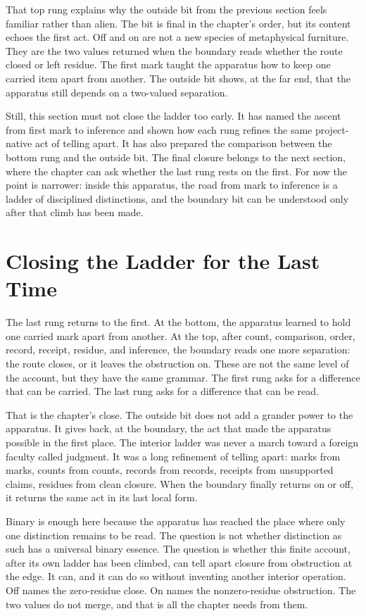 That top rung explains why the outside bit from the previous section feels
familiar rather than alien. The bit is final in the chapter's order, but its
content echoes the first act. Off and on are not a new species of metaphysical
furniture. They are the two values returned when the boundary reads whether the
route closed or left residue. The first mark taught the apparatus how to keep
one carried item apart from another. The outside bit shows, at the far end,
that the apparatus still depends on a two-valued separation.

Still, this section must not close the ladder too early. It has named the
ascent from first mark to inference and shown how each rung refines the same
project-native act of telling apart. It has also prepared the comparison
between the bottom rung and the outside bit. The final closure belongs to the
next section, where the chapter can ask whether the last rung rests on the
first. For now the point is narrower: inside this apparatus, the road from mark
to inference is a ladder of disciplined distinctions, and the boundary bit can
be understood only after that climb has been made.

\section{Closing the Ladder for the Last Time}

The last rung returns to the first. At the bottom, the apparatus learned to
hold one carried mark apart from another. At the top, after count,
comparison, order, record, receipt, residue, and inference, the boundary reads
one more separation: the route closes, or it leaves the obstruction on. These
are not the same level of the account, but they have the same grammar. The
first rung asks for a difference that can be carried. The last rung asks for a
difference that can be read.

That is the chapter's close. The outside bit does not add a grander power to
the apparatus. It gives back, at the boundary, the act that made the apparatus
possible in the first place. The interior ladder was never a march toward a
foreign faculty called judgment. It was a long refinement of telling apart:
marks from marks, counts from counts, records from records, receipts from
unsupported claims, residues from clean closure. When the boundary finally
returns on or off, it returns the same act in its last local form.

Binary is enough here because the apparatus has reached the place where only
one distinction remains to be read. The question is not whether distinction as
such has a universal binary essence. The question is whether this finite
account, after its own ladder has been climbed, can tell apart closure from
obstruction at the edge. It can, and it can do so without inventing another
interior operation. Off names the zero-residue close. On names the
nonzero-residue obstruction. The two values do not merge, and that is all the
chapter needs from them.


